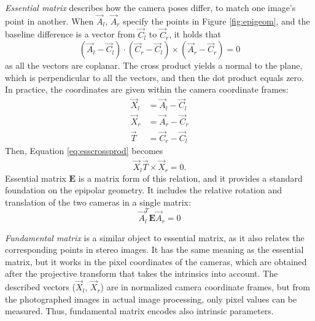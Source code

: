 \emph{Essential matrix} \cite{hartley03multiview} describes how the camera poses differ, to match one image's point in another.
When $\vec A_l$, $\vec A_r$ specify the points in Figure \ref{fig:epigeom}, and the baseline difference is a vector from $\vec C_l$ to $\vec C_r$, it holds that
\begin{equation} \label{eq:esscrossprod}
	(\vec A_l-\vec C_l) \cdot (\vec C_r - \vec C_l) \times (\vec A_r-\vec C_r) = 0
\end{equation}
as all the vectors are coplanar.
The cross product yields a normal to the plane, which is perpendicular to all the vectors, and then the dot product equals zero.
In practice, the coordinates are given within the camera coordinate frames:
\begin{align*}
	\vec X_l &= \vec A_l - \vec C_l\\
	\vec X_r &= \vec A_r - \vec C_r\\
	\vec T &= \vec C_r - \vec C_l
\end{align*}
Then, Equation \ref{eq:esscrossprod} becomes
\begin{equation}
	\vec X_l \dot \vec T \times \vec X_r = 0.
\end{equation}
Essential matrix $\bm E$ is a matrix form of this relation, and it provides a standard foundation on the epipolar geometry.
It includes the relative rotation and translation of the two cameras in a single matrix:
\begin{equation} \label{eq:essential}
	\vec A_l^T \bm E \vec A_r = 0
\end{equation}


\emph{Fundamental matrix} \cite[ch. 11]{hartley03multiview} is a similar object to essential matrix, as it also relates the corresponding points in stereo images.
It has the same meaning as the essential matrix, but it works in the pixel coordinates of the cameras, which are obtained after the projective transform that takes the intrinsics into account.
The described vectors ($\vec X_l$, $\vec X_r$) are in normalized camera coordinate frames, but from the photographed images in actual image processing, only pixel values can be measured.
Thus, fundamental matrix encodes also intrinsic parameters.

